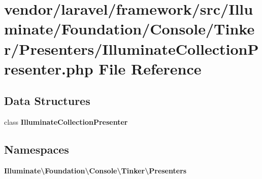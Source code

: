 \section{vendor/laravel/framework/src/\+Illuminate/\+Foundation/\+Console/\+Tinker/\+Presenters/\+Illuminate\+Collection\+Presenter.php File Reference}
\label{_illuminate_collection_presenter_8php}
\subsection*{Data Structures}
\begin{DoxyCompactItemize}
\item 
class {\bf Illuminate\+Collection\+Presenter}
\end{DoxyCompactItemize}
\subsection*{Namespaces}
\begin{DoxyCompactItemize}
\item 
 {\bf Illuminate\textbackslash{}\+Foundation\textbackslash{}\+Console\textbackslash{}\+Tinker\textbackslash{}\+Presenters}
\end{DoxyCompactItemize}
